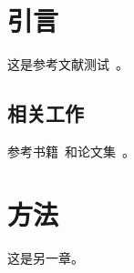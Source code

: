 \documentclass{sduthesis}
\begin{document}
\chapter{引言}
这是参考文献测试~\cite{zhang2020}。

\section{相关工作}
参考书籍~\cite{book2021}和论文集~\cite{inproceedings2022}。

\chapter{方法}
这是另一章。



\end{document}
